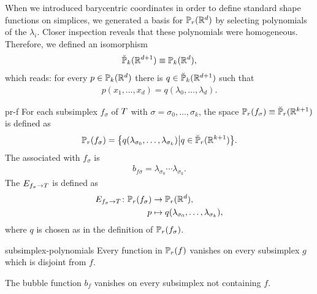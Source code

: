\begin{remark}
  When we introduced barycentric coordinates in order to define
  standard shape functions on simplices, we generated a basis for
  $\P_r(\R^d)$ by selecting polynomials of the $\lambda_i$. Closer
  inspection reveals that these polynomials were
  homogeneous. Therefore, we defined an isomorphism
  \begin{gather}
    \breve \P_k(\R^{d+1}) \equiv \P_k(\R^d),
  \end{gather}
  which reads: for every $p\in \P_k(\R^d)$ there is
  $q\in\breve\P_k(\R^{d+1})$ such that
  \begin{gather*}
    p(x_1,\dots,x_d) = q(\lambda_0,\dots,\lambda_d).
  \end{gather*}
\end{remark}

\begin{Definition}{pr-f}
  For each subsimplex $f_\sigma$ of $\cell$ with
  $\sigma = \sigma_0,\dots,\sigma_k$, the space
  $\P_r(f_\sigma) \equiv \breve\P_r(\R^{k+1})$ is defined as
  \begin{gather}
    \P_r(f_\sigma) = \bigl\{
    q(\lambda_{\sigma_0},\dots,\lambda_{\sigma_k})\big\vert
    q\in\breve \P_r(\R^{k+1})\bigr\}.
  \end{gather}
  The  associated with $f_\sigma$ is
  \begin{gather}
    b_{f\sigma} = \lambda_{\sigma_0}\cdots\lambda_{\sigma_k}.
  \end{gather}
  The  $E_{f_\sigma\to\cell}$ is defined as
  \begin{gather}
    \begin{split}
      E_{f_\sigma\to\cell}\colon \P_r(f_\sigma) &\to \P_r(\R^d),\\
      p &\mapsto q(\lambda_{\sigma_0},\dots,\lambda_{\sigma_k}),
    \end{split}
  \end{gather}
  where $q$ is chosen as in the definition of $\P_r(f_\sigma)$.
\end{Definition}

\begin{Lemma}{subsimplex-polynomials}
  Every function in $\P_r(f)$ vanishes on every subsimplex $g$ which
  is disjoint from $f$.

  The bubble function $b_f$ vanishes on every subsimplex not containing $f$.
\end{Lemma}

